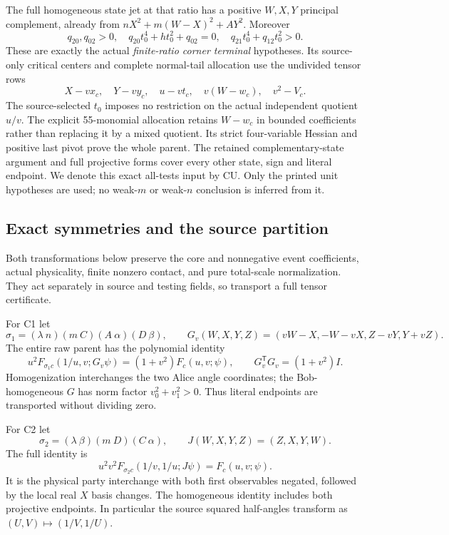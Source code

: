 The full homogeneous state jet at that ratio has a positive
\(W,X,Y\) principal complement, already from
\(nX^2+m(W-X)^2+AY^2\).
Moreover
\[
 q_{20},q_{02}>0,\quad
 q_{20}t_0^4+h t_0^2+q_{02}=0,\quad
 q_{21}t_0^4+q_{12}t_0^2>0.
 \tag{AU11}
\]
These are exactly the actual \emph{finite-ratio corner terminal}
hypotheses. Its source-only critical centers and complete
normal-tail allocation use the undivided tensor rows
\[
 X-vx_c,\quad Y-vy_c,\quad u-vt_c,\quad
 v(W-w_c),\quad v^2-V_c .
\]
The source-selected \(t_0\) imposes no restriction on the actual
independent quotient \(u/v\). The explicit 55-monomial allocation
retains \(W-w_c\) in bounded coefficients rather than replacing it
by a mixed quotient. Its strict four-variable Hessian and positive
last pivot prove the whole parent.
The retained complementary-state argument and full projective
forms cover every other state, sign and literal endpoint.
We denote this exact all-tests input by \(\mathrm{CU}\).
Only the printed unit hypotheses are used; no weak-\(m\) or
weak-\(n\) conclusion is inferred from it.

\subsection{Exact symmetries and the source partition}

Both transformations below preserve the core and nonnegative event
coefficients, actual physicality, finite nonzero contact, and pure
total-scale normalization. They act separately in source and testing
fields, so transport a full tensor certificate.

For C1 let
\[
 \sigma_1=(\lambda\ n)(m\ C)(A\ \alpha)(D\ \beta),\qquad
 G_v(W,X,Y,Z)=(vW-X,-W-vX,Z-vY,Y+vZ).
\]
The entire raw parent has the polynomial identity
\[
 u^2F_{\sigma_1c}(1/u,v;G_v\psi)
       =(1+v^2)F_c(u,v;\psi),\qquad
 G_v^{\mathsf T}G_v=(1+v^2)I .
 \tag{AU12}
\]
Homogenization interchanges the two Alice angle coordinates;
the Bob-homogeneous \(G\) has norm factor \(v_0^2+v_1^2>0\).
Thus literal endpoints are transported without dividing zero.

For C2 let
\[
 \sigma_2=(\lambda\ \beta)(m\ D)(C\ \alpha),\qquad
 J(W,X,Y,Z)=(Z,X,Y,W).
\]
The full identity is
\[
 u^2v^2F_{\sigma_2c}(1/v,1/u;J\psi)=F_c(u,v;\psi).
 \tag{AU13}
\]
It is the physical party interchange with both first observables
negated, followed by the local real \(X\) basis changes.
The homogeneous identity includes both projective endpoints.
In particular the source squared half-angles transform as
\((U,V)\mapsto(1/V,1/U)\).

